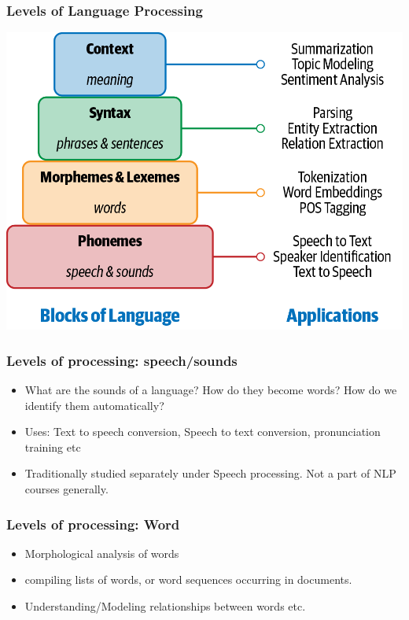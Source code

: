 \documentclass{beamer}
\begin{document}
\begin{frame}
\frametitle{Levels of Language Processing}
\includegraphics[width=\textwidth]{figures/langblocks.png}
\end{frame}

\begin{frame}
\frametitle{Levels of processing: speech/sounds}
\begin{itemize}
\item What are the sounds of a language? How do they become words? How do we identify them automatically? 
\item Uses: Text to speech conversion, Speech to text conversion, pronunciation training etc
\item Traditionally studied separately under Speech processing. Not a part of NLP courses generally.
\end{itemize}
\end{frame}

\begin{frame}
\frametitle{Levels of processing: Word}
\begin{itemize}
\item Morphological analysis of words
\item compiling lists of words, or word sequences occurring in documents.
\item Understanding/Modeling relationships between words etc. 
\end{itemize}
\end{frame}
\end{document}
